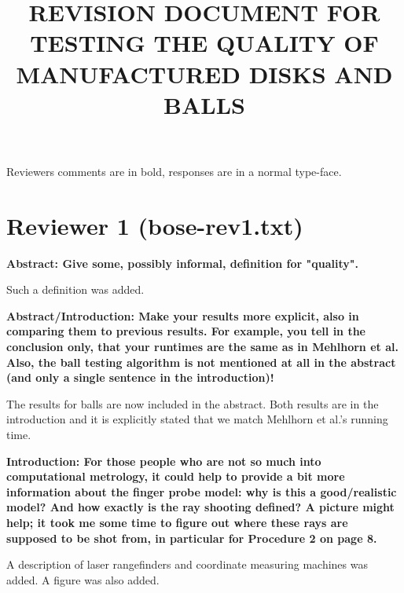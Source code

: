 \documentclass[lotsofwhite]{patmorin}
\title{\MakeUppercase{Revision Document for}\\
	\MakeUppercase{Testing the Quality of Manufactured Disks and Balls}}
\author{}
\date{}
\newenvironment{comment}{\noindent\bf}{}
\newenvironment{response}{\noindent}{}
\begin{document}
\maketitle

\noindent
Reviewers comments are in bold, responses are in a normal type-face.

\section*{Reviewer 1 (bose-rev1.txt)}
\begin{comment}
Abstract: Give some, possibly informal, definition for "quality".
\end{comment}

\begin{response}
Such a definition was added.
\end{response}

\begin{comment}
Abstract/Introduction: Make your results more explicit, also in
comparing them to previous results. For example, you tell in the
conclusion only, that your runtimes are the same as in Mehlhorn et
al. Also, the ball testing algorithm is not mentioned at all in the
abstract (and only a single sentence in the introduction)!
\end{comment}

\begin{response}
The results for balls are now included in the abstract.  Both results
are in the introduction and it is explicitly stated that we match
Mehlhorn et al.'s running time.
\end{response}

\begin{comment}
Introduction: For those people who are not so much into computational
metrology, it could help to provide a bit more information about the
finger probe model: why is this a good/realistic model? And how
exactly is the ray shooting defined? A picture might help; it took me
some time to figure out where these rays are supposed to be shot from,
in particular for Procedure 2 on page 8.
\end{comment}

\begin{response}
A description of laser rangefinders and coordinate measuring machines
was added.  A figure was also added.
\end{response}
\end{document}
